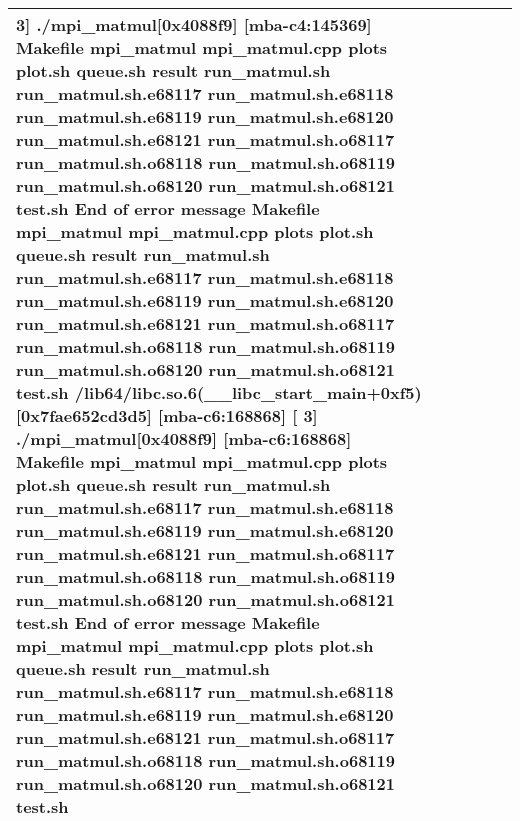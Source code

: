 \documentclass{article}
\begin{document}
\begin{tabular} { | l | l | l | l | l | l | }
3] ./mpi_matmul[0x4088f9] [mba-c4:145369] Makefile mpi_matmul mpi_matmul.cpp plots plot.sh queue.sh result run_matmul.sh run_matmul.sh.e68117 run_matmul.sh.e68118 run_matmul.sh.e68119 run_matmul.sh.e68120 run_matmul.sh.e68121 run_matmul.sh.o68117 run_matmul.sh.o68118 run_matmul.sh.o68119 run_matmul.sh.o68120 run_matmul.sh.o68121 test.sh End of error message Makefile mpi_matmul mpi_matmul.cpp plots plot.sh queue.sh result run_matmul.sh run_matmul.sh.e68117 run_matmul.sh.e68118 run_matmul.sh.e68119 run_matmul.sh.e68120 run_matmul.sh.e68121 run_matmul.sh.o68117 run_matmul.sh.o68118 run_matmul.sh.o68119 run_matmul.sh.o68120 run_matmul.sh.o68121 test.sh /lib64/libc.so.6(__libc_start_main+0xf5)[0x7fae652cd3d5] [mba-c6:168868] [ 3] ./mpi_matmul[0x4088f9] [mba-c6:168868] Makefile mpi_matmul mpi_matmul.cpp plots plot.sh queue.sh result run_matmul.sh run_matmul.sh.e68117 run_matmul.sh.e68118 run_matmul.sh.e68119 run_matmul.sh.e68120 run_matmul.sh.e68121 run_matmul.sh.o68117 run_matmul.sh.o68118 run_matmul.sh.o68119 run_matmul.sh.o68120 run_matmul.sh.o68121 test.sh End of error message Makefile mpi_matmul mpi_matmul.cpp plots plot.sh queue.sh result run_matmul.sh run_matmul.sh.e68117 run_matmul.sh.e68118 run_matmul.sh.e68119 run_matmul.sh.e68120 run_matmul.sh.e68121 run_matmul.sh.o68117 run_matmul.sh.o68118 run_matmul.sh.o68119 run_matmul.sh.o68120 run_matmul.sh.o68121 test.sh \\ \hline

\end{tabular}
\end{document}
